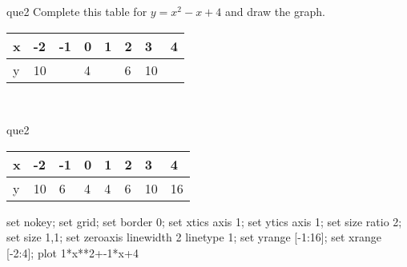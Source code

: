 \documentclass[13.5pt, varwidth=true]{beamer}
\begin{document}
\begin{frame}[shrink=19,fragile]
	\begin{beamercolorbox}[rounded=true, left, shadow=true,wd=14.8cm]{que2}
		 Complete this table for $y = x^{2} - x + 4$ and draw the graph. \\[0.3cm] \renewcommand{\arraystretch}{1.2}\begin{tabular}{|C|C|C|C|C|C|C|C|} \hline x & -2 & -1 & 0 & 1 & 2 & 3 & 4 \\ \hline y & 10 &  & 4 &  & 6 & 10 & \\ \hline \end{tabular}\\[0.3cm]
	\end{beamercolorbox}
\end{frame}
\begin{frame}[shrink=19,fragile]
	\begin{beamercolorbox}[rounded=true, left, shadow=true,wd=14.8cm]{que2}
		\renewcommand{\arraystretch}{1.2}\begin{tabular}{|C|C|C|C|C|C|C|C|} \hline x & -2 & -1 & 0 & 1 & 2 & 3 & 4 \\ \hline y & 10 & 6 & 4 & 4 & 6 & 10 & 16\\ \hline \end{tabular}\begin{gnuplot}[terminal=pdf] set nokey; set grid; set border 0; set xtics axis 1; set ytics axis 1; set size ratio 2; set size 1,1; set zeroaxis linewidth 2 linetype 1; set yrange [-1:16]; set xrange [-2:4]; plot 1*x**2+-1*x+4 \end{gnuplot}
	\end{beamercolorbox}
\end{frame}
\end{document}
